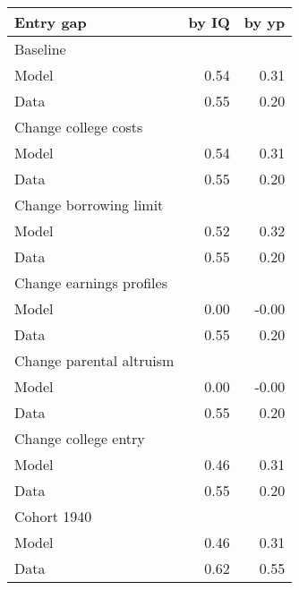 \begin{tabular}{lrr}
\hline
Entry gap & by IQ  & by yp  \\ 
\hline
Baseline &   &   \\ 
Model & 0.54  & 0.31  \\ 
Data & 0.55  & 0.20  \\ 
Change college costs &   &   \\ 
Model & 0.54  & 0.31  \\ 
Data & 0.55  & 0.20  \\ 
Change borrowing limit &   &   \\ 
Model & 0.52  & 0.32  \\ 
Data & 0.55  & 0.20  \\ 
Change earnings profiles &   &   \\ 
Model & 0.00  & -0.00  \\ 
Data & 0.55  & 0.20  \\ 
Change parental altruism &   &   \\ 
Model & 0.00  & -0.00  \\ 
Data & 0.55  & 0.20  \\ 
Change college entry &   &   \\ 
Model & 0.46  & 0.31  \\ 
Data & 0.55  & 0.20  \\ 
Cohort 1940 &   &   \\ 
Model & 0.46  & 0.31  \\ 
Data & 0.62  & 0.55  \\ 
\hline
\end{tabular}%
